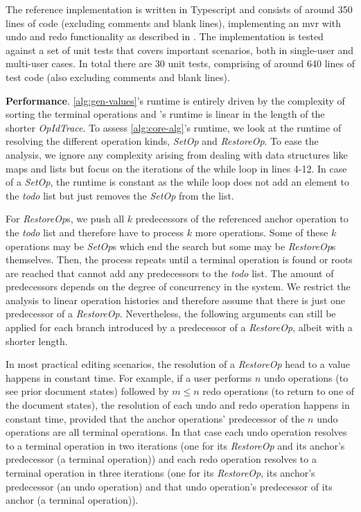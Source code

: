\documentclass[sigplan,natbib=false,review]{acmart}
\newcommand{\setopkind}{\textit{SetOp}}
\newcommand{\restopkind}{\textit{RestoreOp}}
\newcommand{\opidtrace}{\textit{OpIdTrace}}
\begin{document}
The reference implementation is written in Typescript and consists of around 350
lines of code (excluding comments and blank lines),
implementing an \gls*{mvr} with undo and redo functionality as described
in .
The implementation is tested against a set of unit tests that covers important
scenarios, both in single-user and multi-user cases.
In total there are 30 unit tests,
comprising of around 640 lines of test code (also excluding comments and blank lines).

\textbf{Performance}.
\autoref{alg:gen-values}'s runtime is entirely driven by the
complexity of sorting the terminal operations and 's
runtime is linear in the length of the shorter \opidtrace{}.
To assess \autoref{alg:core-alg}'s runtime,
we look at the runtime of resolving the different operation kinds,
\setopkind{} and \restopkind{}.
To ease the analysis, we ignore any complexity arising from dealing with
data structures like maps and lists but focus on the iterations
of the while loop in lines 4-12.
In case of a \setopkind{}, the runtime is constant as the while loop
does not add an element to the \textit{todo} list but just removes the
\setopkind{} from the list.

For \restopkind{}s, we push all $k$ predecessors of the referenced anchor operation
to the \textit{todo} list and therefore have to process $k$ more operations.
Some of these $k$ operations may be \setopkind{}s which end the search but
some may be \restopkind{}s themselves. 
Then, the process repeats until a terminal operation is found or
roots are reached that cannot add any predecessors to the \textit{todo} list.
The amount of predecessors depends on the degree of concurrency in the system.
We restrict the analysis to linear operation histories and therefore assume
that there is just one predecessor of a \restopkind{}.
Nevertheless, the following arguments can still be applied for each branch
introduced by a predecessor of a \restopkind{}, albeit with a shorter length.

In most practical editing scenarios,
the resolution of a \restopkind{} head to a value happens in constant time.
For example, if a user performs $n$ undo operations (to see prior document states)
followed by $m \leq n$ redo operations (to return to one of the document states),
the resolution of each undo and redo operation happens in constant time,
provided that the anchor operations' predecessor of the $n$ undo operations
are all terminal operations.
In that case each undo operation resolves to a terminal operation in two iterations
(one for its \restopkind{} and its anchor's predecessor (a terminal operation))
and each redo operation resolves
to a terminal operation in three iterations
(one for its \restopkind{}, its anchor's
predecessor (an undo operation) and that undo operation's predecessor of its anchor
(a terminal operation)).
\end{document}
